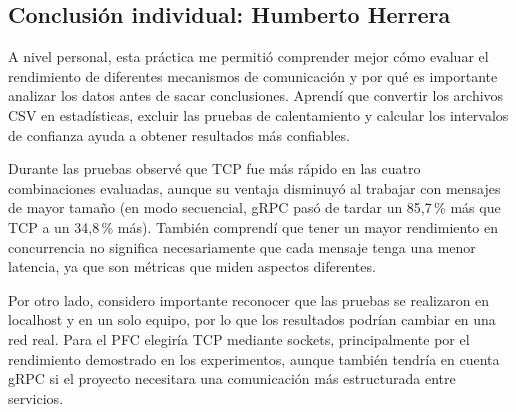 \subsection{Conclusión individual: Humberto Herrera}

A nivel personal, esta práctica me permitió comprender mejor cómo evaluar el rendimiento de diferentes mecanismos de comunicación y por qué es importante analizar los datos antes de sacar conclusiones. Aprendí que convertir los archivos CSV en estadísticas, excluir las pruebas de calentamiento y calcular los intervalos de confianza ayuda a obtener resultados más confiables.

Durante las pruebas observé que TCP fue más rápido en las cuatro combinaciones evaluadas, aunque su ventaja disminuyó al trabajar con mensajes de mayor tamaño (en modo secuencial, gRPC pasó de tardar un 85,7\,\% más que TCP a un 34,8\,\% más). También comprendí que tener un mayor rendimiento en concurrencia no significa necesariamente que cada mensaje tenga una menor latencia, ya que son métricas que miden aspectos diferentes.

Por otro lado, considero importante reconocer que las pruebas se realizaron en localhost y en un solo equipo, por lo que los resultados podrían cambiar en una red real. Para el PFC elegiría TCP mediante sockets, principalmente por el rendimiento demostrado en los experimentos, aunque también tendría en cuenta gRPC si el proyecto necesitara una comunicación más estructurada entre servicios.